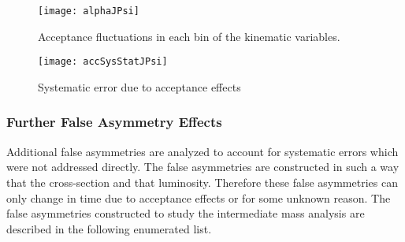 \begin{figure}[h!t]
  \begin{center}
    \texttt{[image: alphaJPsi]}
    \caption{Acceptance fluctuations in each bin of the kinematic variables.}
    \label{fig::alphaJPsi}
  \end{center}
\end{figure}

\begin{figure}[h!t]
  \begin{center}
    \texttt{[image: accSysStatJPsi]}
    \caption{Systematic error due to acceptance effects}
    \label{fig::accSysStatJPsi}
  \end{center}
\end{figure}

\subsubsection{Further False Asymmetry Effects}
Additional false asymmetries are analyzed to account for systematic errors which
were not addressed directly.  The false asymmetries are constructed in such a
way that the cross-section and that luminosity.  Therefore these false
asymmetries can only change in time due to acceptance effects or for some
unknown reason.  The false asymmetries constructed to study the intermediate
mass analysis are described in the following enumerated list.

